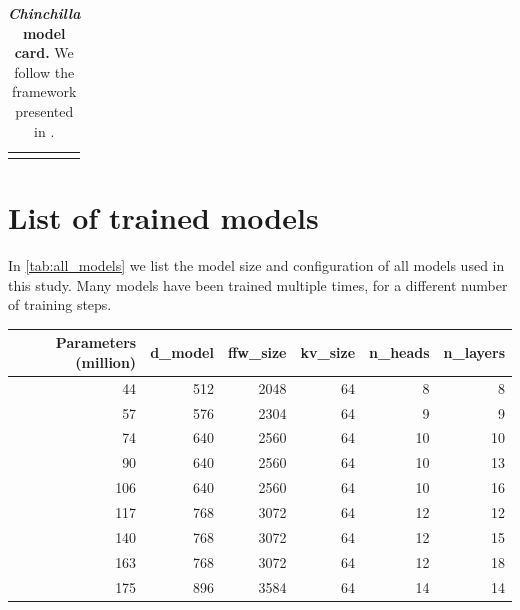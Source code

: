 \documentclass[11pt, a4paper, logo, copyright, nonumbering]{deepmind}
\newcommand{\chinchilla}{\textit{Chinchilla}\xspace}
\begin{document}
\begin{center}
\begin{longtable}[ht]{p{0.35\linewidth} | p{0.6\linewidth}}
    \bottomrule
    \caption{\textbf{\chinchilla model card.} We follow the framework presented in \citet{mitchell2019model}.
    }
    \label{tab:chinchilla-model-card}
\end{longtable}
\end{center}

\section{List of trained models}
In \autoref{tab:all_models} we list the model size and configuration of all models used in this study. 
Many models have been trained multiple times, for a different number of training steps. 
\clearpage
\footnotesize
\begin{longtable}[h!]
{r | rrrrr }
\toprule
Parameters (million) &  d\_model &  ffw\_size &  kv\_size &  n\_heads &  n\_layers \\
\midrule
    44 &                   512 &                          2048 &                     64 &                       8 &                        8 \\
    57 &                   576 &                          2304 &                     64 &                       9 &                        9 \\
    74 &                   640 &                          2560 &                     64 &                      10 &                       10 \\
    90 &                   640 &                          2560 &                     64 &                      10 &                       13 \\
   106 &                   640 &                          2560 &                     64 &                      10 &                       16 \\
   117 &                   768 &                          3072 &                     64 &                      12 &                       12 \\
   140 &                   768 &                          3072 &                     64 &                      12 &                       15 \\
   163 &                   768 &                          3072 &                     64 &                      12 &                       18 \\
   175 &                   896 &                          3584 &                     64 &                      14 &                       14 \\

\end{longtable}
\end{document}
